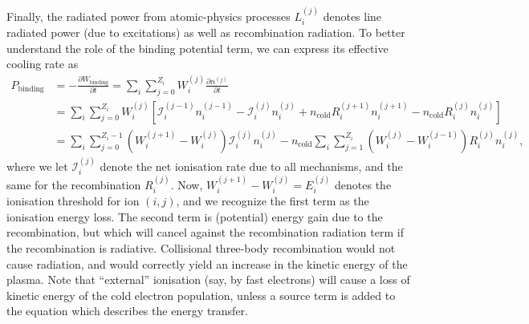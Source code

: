 \documentclass[11pt,a4paper]{article}
\newcommand{\sub}[1]{\ensuremath{_{\text{#1}}}}
\begin{document}

Finally, the radiated power from atomic-physics processes $L_i^{(j)}$ denotes line radiated power (due to excitations) as well as recombination radiation. To better understand the role of the binding potential term, we can express its effective cooling rate as
\begin{align}
P\sub{binding} &= -\frac{\partial W\sub{binding}}{\partial t} = \sum_i \sum_{j=0}^{Z_i} W_i^{(j)} \frac{\partial n^{(j)}}{\partial t}\nonumber \\
&=  \sum_i \sum_{j=0}^{Z_i} W_i^{(j)} \left[ \mathcal{I}_i^{(j-1)}n_i^{(j-1)} - \mathcal{I}_i^{(j)}n_i^{(j)} + n\sub{cold} R_i^{(j+1)}n_i^{(j+1)} -n\sub{cold} R_i^{(j)}n_i^{(j)} \right] \nonumber \\
&= \sum_i \sum_{j=0}^{Z_i-1} (W_i^{(j+1)}-W_i^{(j)})\mathcal{I}_i^{(j)}n_i^{(j)} -  n\sub{cold}\sum_i \sum_{j=1}^{Z_i} (W_i^{(j)} - W_i^{(j-1)})R_i^{(j)}n_i^{(j)} ,
\end{align}
where we let $\mathcal{I}_i^{(j)}$ denote the net ionisation rate due to all mechanisms, and the same for the recombination $R_i^{(j)}$. Now, $W_i^{(j+1)}-W_i^{(j)} = E_i^{(j)}$ denotes the ionisation threshold for ion $(i,j)$, and we recognize the first term as the ionisation energy loss. The second term is (potential) energy gain due to the recombination, but which will cancel against the recombination radiation term if the recombination is radiative. Collisional three-body recombination would not cause radiation, and would correctly yield an increase in the kinetic energy of the plasma.
Note that ``external'' ionisation (say, by fast electrons) will cause a loss of kinetic energy of the cold electron population, unless a source term is added to the equation which describes the energy transfer.
\end{document}
